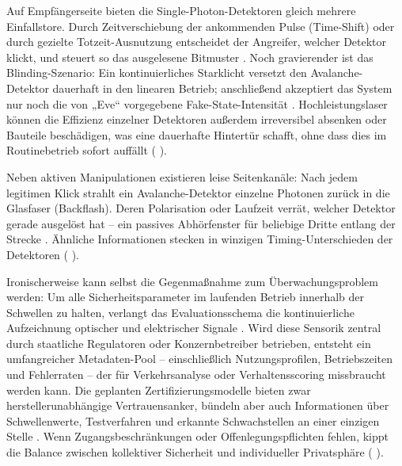 Auf Empfängerseite bieten die Single-Photon-Detektoren gleich mehrere Einfallstore. Durch Zeitverschiebung der ankommenden Pulse (Time-Shift) oder durch gezielte Totzeit-Ausnutzung entscheidet der Angreifer, welcher Detektor klickt, und steuert so das ausgelesene Bitmuster . Noch gravierender ist das Blinding-Szenario: Ein kontinuierliches Starklicht versetzt den Avalanche-Detektor dauerhaft in den linearen Betrieb; anschließend akzeptiert das System nur noch die von „Eve“ vorgegebene Fake-State-Intensität . Hochleistungslaser können die Effizienz einzelner Detektoren außerdem irreversibel absenken oder Bauteile beschädigen, was eine dauerhafte Hintertür schafft, ohne dass dies im Routinebetrieb sofort auffällt (\cite{sunReviewSecurityEvaluation2022} ).

Neben aktiven Manipulationen existieren leise Seitenkanäle: Nach jedem legitimen Klick strahlt ein Avalanche-Detektor einzelne Photonen zurück in die Glasfaser (Backflash). Deren Polarisation oder Laufzeit verrät, welcher Detektor gerade ausgelöst hat – ein passives Abhörfenster für beliebige Dritte entlang der Strecke . Ähnliche Informationen stecken in winzigen Timing-Unterschieden der Detektoren (\cite{sunReviewSecurityEvaluation2022} ).

Ironischerweise kann selbst die Gegenmaßnahme zum Überwachungsproblem werden: Um alle Sicherheitsparameter im laufenden Betrieb innerhalb der Schwellen zu halten, verlangt das Evaluationsschema die kontinuierliche Aufzeichnung optischer und elektrischer Signale . Wird diese Sensorik zentral durch staatliche Regulatoren oder Konzernbetreiber betrieben, entsteht ein umfangreicher Metadaten-Pool – einschließlich Nutzungsprofilen, Betriebszeiten und Fehlerraten – der für Verkehrsanalyse oder Verhaltensscoring missbraucht werden kann. Die geplanten Zertifizierungsmodelle bieten zwar herstellerunabhängige Vertrauensanker, bündeln aber auch Informationen über Schwellenwerte, Testverfahren und erkannte Schwachstellen an einer einzigen Stelle . Wenn Zugangsbeschränkungen oder Offenlegungspflichten fehlen, kippt die Balance zwischen kollektiver Sicherheit und individueller Privatsphäre (\cite{sunReviewSecurityEvaluation2022} ).






